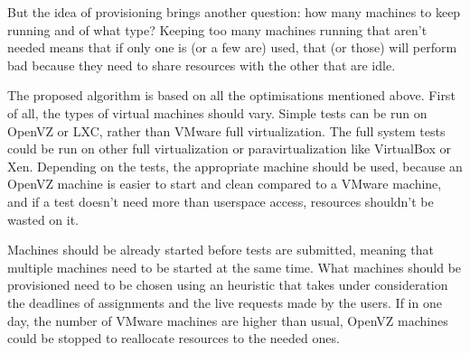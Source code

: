 But the idea of provisioning brings another question: how many machines to
keep running and of what type? Keeping too many machines running that
aren't needed means that if only one is (or a few are) used, that (or
those) will perform bad because they need to share resources with the other
that are idle.

The proposed algorithm is based on all the optimisations mentioned above.
First of all, the types of virtual machines should vary. Simple tests can
be run on OpenVZ or LXC, rather than VMware full virtualization. The full
system tests could be run on other full virtualization or
paravirtualization like VirtualBox or Xen. Depending on the tests, the
appropriate machine should be used, because an OpenVZ machine is easier to
start and clean compared to a VMware machine, and if a test doesn't need
more than userspace access, resources shouldn't be wasted on it.

Machines should be already started before tests are submitted, meaning that
multiple machines need to be started at the same time. What machines should
be provisioned need to be chosen using an heuristic that takes under
consideration the deadlines of assignments and the live requests made by
the users. If in one day, the number of VMware machines are higher than
usual, OpenVZ machines could be stopped to reallocate resources to the
needed ones.
